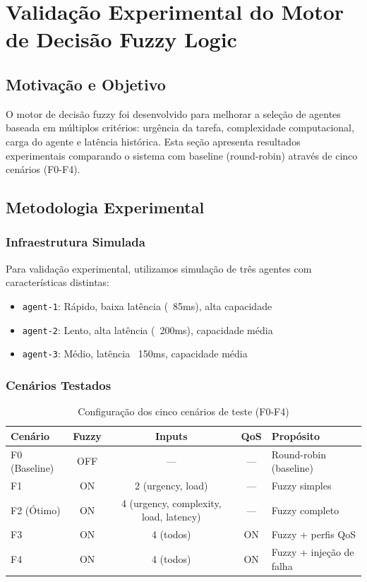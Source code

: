 
\section{Validação Experimental do Motor de Decisão Fuzzy Logic}
\label{sec:fuzzy_validation}

\subsection{Motivação e Objetivo}

O motor de decisão fuzzy foi desenvolvido para melhorar a seleção de agentes baseada em múltiplos critérios: urgência da tarefa, complexidade computacional, carga do agente e latência histórica. Esta seção apresenta resultados experimentais comparando o sistema com baseline (round-robin) através de cinco cenários (F0-F4).

\subsection{Metodologia Experimental}

\subsubsection{Infraestrutura Simulada}

Para validação experimental, utilizamos simulação de três agentes com características distintas:
\begin{itemize}
  \item \texttt{agent-1}: Rápido, baixa latência (~85ms), alta capacidade
  \item \texttt{agent-2}: Lento, alta latência (~200ms), capacidade média
  \item \texttt{agent-3}: Médio, latência ~150ms, capacidade média
\end{itemize}

\subsubsection{Cenários Testados}

\begin{table}[h]
\centering
\caption{Configuração dos cinco cenários de teste (F0-F4)}
\label{tab:fuzzy_scenarios}
\begin{tabularx}{\textwidth}{|l|c|c|c|X|}
\hline
\textbf{Cenário} & \textbf{Fuzzy} & \textbf{Inputs} & \textbf{QoS} & \textbf{Propósito} \\
\hline
F0 (Baseline) & OFF & — & — & Round-robin (baseline) \\
\hline
F1 & ON & 2 (urgency, load) & — & Fuzzy simples \\
\hline
F2 (Ótimo) & ON & 4 (urgency, complexity, load, latency) & — & Fuzzy completo \\
\hline
F3 & ON & 4 (todos) & ON & Fuzzy + perfis QoS \\
\hline
F4 & ON & 4 (todos) & ON & Fuzzy + injeção de falha \\
\hline
\end{tabularx}
\end{table}

